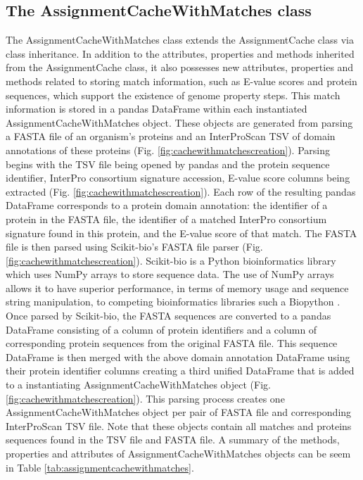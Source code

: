 \subsection{The AssignmentCacheWithMatches class}

The AssignmentCacheWithMatches class extends the AssignmentCache class via class inheritance. In addition to the attributes, properties and methods inherited from the AssignmentCache class, it also possesses new attributes, properties and methods related to storing match information, such as E-value scores and protein sequences, which support the existence of genome property steps. This match information is stored in a pandas DataFrame within each instantiated AssignmentCacheWithMatches object. These objects are generated from parsing a FASTA file \cite{pearson19905} of an organism's proteins and an InterProScan TSV of domain annotations of these proteins (Fig. \ref{fig:cachewithmatchescreation}). Parsing begins with the TSV file being opened by pandas and the protein sequence identifier, InterPro consortium signature accession, E-value score columns being extracted (Fig. \ref{fig:cachewithmatchescreation}). Each row of the resulting pandas DataFrame corresponds to a protein domain annotation: the identifier of a protein in the FASTA file, the identifier of a matched InterPro consortium signature found in this protein, and the E-value score of that match. The FASTA file is then parsed using Scikit-bio's FASTA file parser (Fig. \ref{fig:cachewithmatchescreation})\cite{scikitbio}. Scikit-bio is a Python bioinformatics library which uses NumPy arrays to store sequence data. The use of NumPy arrays allows it to have superior performance, in terms of memory usage and sequence string manipulation, to competing bioinformatics libraries such a Biopython \cite{cock2009biopython}. Once parsed by Scikit-bio, the FASTA sequences are converted to a pandas DataFrame consisting of a column of protein identifiers and a column of corresponding protein sequences from the original FASTA file. This sequence DataFrame is then merged with the above domain annotation DataFrame using their protein identifier columns creating a third unified DataFrame that is added to a instantiating AssignmentCacheWithMatches object (Fig. \ref{fig:cachewithmatchescreation}). This parsing process creates one AssignmentCacheWithMatches object per pair of FASTA file and corresponding InterProScan TSV file. Note that these objects contain all matches and proteins sequences found in the TSV file and FASTA file. A summary of the methods, properties and attributes of AssignmentCacheWithMatches objects can be seem in Table \ref{tab:assignmentcachewithmatches}. 

